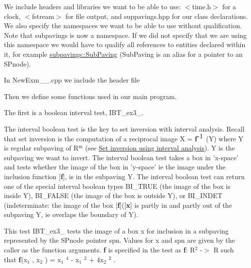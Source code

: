 \-We include headers and libraries we want to be able to use\-: $<$time.\-h$>$ for a clock, $<$fstream$>$ for file output, and suppavings.\-hpp for our class declarations. \-We also specify the namespaces we want to be able to use without qualification. \-Note that subpavings is now a namespace. \-If we did not specify that we are using this namespace we would have to qualify all references to entities declared within it, for example \hyperlink{namespacesubpavings_a7e50e3fe54ef41646fbb6155160805cc}{subpavings\-::\-Sub\-Paving} (\-Sub\-Paving is an alias for a pointer to an \-S\-Pnode).

\-In \-New\-Exm\-\_\-\_.\-cpp we include the header file




\begin{DoxyCodeInclude}

\end{DoxyCodeInclude}


\-Then we define some functions used in our main program.

\-The first is a boolean interval test, \label{newsubpavings_NewIBT_ex3_4}%
\hypertarget{newsubpavings_NewIBT_ex3_4}{}%
\-I\-B\-T\-\_\-ex3\-\_.

\-The interval boolean test is the key to set inversion with interval analysis. \-Recall that set inversion is the computation of a reciprocal image \-X = {\bfseries f}$^{\mbox{-\/1}}$ (\-Y) where \-Y is regular subpaving of \-R$^{\mbox{m}}$  (see \hyperlink{AIASubPavings_AIAsec_SIVIA}{\-Set inversion using interval analysis}). \-Y is the subpaving we want to invert. \-The interval boolean test takes a box in 'x-\/space' and tests whether the image of the box in 'y-\/space' ie the image under the inclusion function \mbox{[}{\bfseries f}\mbox{]}, is in the subpaving \-Y. \-The interval boolean test can return one of the special interval boolean types \-B\-I\-\_\-\-T\-R\-U\-E (the image of the box is inside \-Y), \-B\-I\-\_\-\-F\-A\-L\-S\-E (the image of the box is outside \-Y), or \-B\-I\-\_\-\-I\-N\-D\-E\-T (indeterminate\-: the image of the box \mbox{[}{\bfseries f}\mbox{]}(\mbox{[}{\bfseries x}\mbox{]} is partly in and partly out of the subpaving \-Y, ie overlaps the boundary of \-Y).

\-This test \label{newsubpavings_NewIBT_ex3_4}%
\hypertarget{newsubpavings_NewIBT_ex3_4}{}%
\-I\-B\-T\-\_\-ex3\-\_ tests the image of a box x for inclusion in a subpaving represented by the \-S\-Pnode pointer spn. \-Values for x and spn are given by the caller as the function arguments. {\bfseries f} is specified in the test as {\bfseries f}\-: \-R$^{\mbox{2}}$  -\/$>$ \-R such that {\bfseries f}(x$_{\mbox{1}}$ , x$_{\mbox{2}}$ ) = x$_{\mbox{1}}$ $^{\mbox{4}}$  -\/ x$_{\mbox{1}}$ $^{\mbox{2}}$  + 4x$_{\mbox{2}}$ $^{\mbox{2}}$ .


